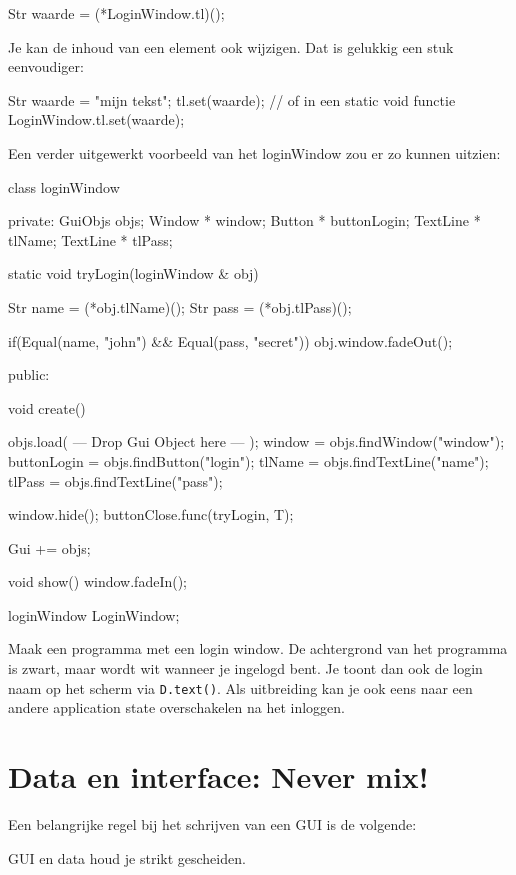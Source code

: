 \begin{code}
Str waarde = (*LoginWindow.tl)();
\end{code}

Je kan de inhoud van een element ook wijzigen. Dat is gelukkig een stuk eenvoudiger:

\begin{code}
Str waarde = "mijn tekst";
tl.set(waarde);
// of in een static void functie
LoginWindow.tl.set(waarde);
\end{code}

Een verder uitgewerkt voorbeeld van het loginWindow zou er zo kunnen uitzien:

\begin{code}
class loginWindow
{
private:
   GuiObjs objs;
	 Window * window;
	 Button * buttonLogin;
   TextLine * tlName;
	 TextLine * tlPass;
	
   static void tryLogin(loginWindow & obj) {
	    Str name = (*obj.tlName)();
			Str pass = (*obj.tlPass)();
			
			if(Equal(name, "john") && Equal(pass, "secret")) {
			   obj.window.fadeOut();
		  }
	 }
	
public:

   void create()
   {
      objs.load( --- Drop Gui Object here --- );
      window = objs.findWindow("window");
			buttonLogin = objs.findButton("login");
			tlName = objs.findTextLine("name");
			tlPass = objs.findTextLine("pass");
			
			window.hide();
			buttonClose.func(tryLogin, T);
			
      Gui += objs;
   }
	
	 void show() {
	    window.fadeIn();
   }
}
loginWindow LoginWindow;
\end{code}

\begin{exercise}
Maak een programma met een login window. De achtergrond van het programma is zwart, maar wordt wit wanneer je ingelogd bent. Je toont dan ook de login naam op het scherm via \texttt{D.text()}. Als uitbreiding kan je ook eens naar een andere application state overschakelen na het inloggen.
\end{exercise}

\section{Data en interface: Never mix!}
Een belangrijke regel bij het schrijven van een GUI is de volgende:

\begin{note}
GUI en data houd je strikt gescheiden.
\end{note}

